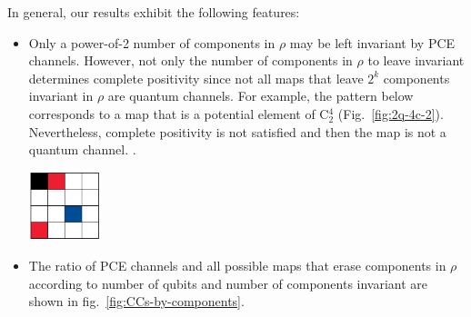 \documentclass[11pt,dvipsnames]{article} %
\newcommand{\fref}[1]{fig.~\ref{#1}}  \newcommand{\tref}[1]{table~\ref{#1}}
\newcommand{\Fref}[1]{Fig.~\ref{#1}}  \newcommand{\Tref}[1]{Table~\ref{#1}}
\newcommand{\1}{\mathds{1}}
\begin{document}
In general, our results exhibit the following features:
\begin{itemize}
\item Only a power-of-2 number of components in $\rho$ 
may be left invariant by PCE 
channels. However, not only the number of components in $\rho$ 
to leave invariant determines complete positivity since
not all maps that leave $2^{k}$ components invariant in $\rho$
are quantum channels. For example, the pattern below corresponds 
to a map that is a potential element of C${}_2^4$ (\Fref{fig:2q-4c-2}).
Nevertheless, complete positivity is not satisfied 
and then the map is not a quantum channel. 
. 
\begin{center}
	\includegraphics[height=2cm]{img/not-cc}
\end{center}

\item 
The ratio of PCE channels and all possible maps
that erase components in $\rho$ according to number of qubits 
and number of components
invariant are shown in \fref{fig:CCs-by-components}.
  



\end{itemize}
\end{document}
